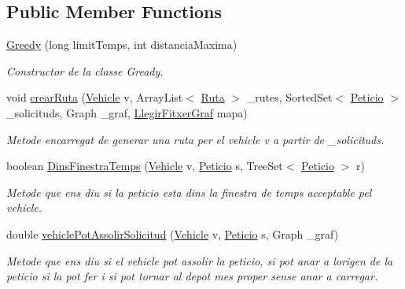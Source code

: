 \subsection*{Public Member Functions}
\begin{DoxyCompactItemize}
\item 
\hyperlink{class_portam_a_pro_p_1_1_greedy_abeac8894d01a8df14d99ced2988d66c3}{Greedy} (long limit\+Temps, int distancia\+Maxima)
\begin{DoxyCompactList}\small\item\em Constructor de la classe Gready. \end{DoxyCompactList}\item 
void \hyperlink{class_portam_a_pro_p_1_1_greedy_a88ab480dd626665d2480220b3a032cc9}{crear\+Ruta} (\hyperlink{class_portam_a_pro_p_1_1_vehicle}{Vehicle} v, Array\+List$<$ \hyperlink{class_portam_a_pro_p_1_1_ruta}{Ruta} $>$ \+\_\+rutes, Sorted\+Set$<$ \hyperlink{class_portam_a_pro_p_1_1_peticio}{Peticio} $>$ \+\_\+solicituds, Graph \+\_\+graf, \hyperlink{class_portam_a_pro_p_1_1_llegir_fitxer_graf}{Llegir\+Fitxer\+Graf} mapa)
\begin{DoxyCompactList}\small\item\em Metode encarregat de generar una ruta per el vehicle v a partir de \+\_\+solicituds. \end{DoxyCompactList}\item 
boolean \hyperlink{class_portam_a_pro_p_1_1_greedy_adf602e9d56f5dab642b1deb80719d7fa}{Dins\+Finestra\+Temps} (\hyperlink{class_portam_a_pro_p_1_1_vehicle}{Vehicle} v, \hyperlink{class_portam_a_pro_p_1_1_peticio}{Peticio} s, Tree\+Set$<$ \hyperlink{class_portam_a_pro_p_1_1_peticio}{Peticio} $>$ r)
\begin{DoxyCompactList}\small\item\em Metode que ens diu si la peticio esta dins la finestra de temps acceptable pel vehicle. \end{DoxyCompactList}\item 
double \hyperlink{class_portam_a_pro_p_1_1_greedy_ab5ac383d579ef9227ca99e52075e893d}{vehicle\+Pot\+Assolir\+Solicitud} (\hyperlink{class_portam_a_pro_p_1_1_vehicle}{Vehicle} v, \hyperlink{class_portam_a_pro_p_1_1_peticio}{Peticio} s, Graph \+\_\+graf)
\begin{DoxyCompactList}\small\item\em Metode que ens diu si el vehicle pot assolir la peticio, si pot anar a l\textquotesingle{}origen de la peticio si la pot fer i si pot tornar al depot mes proper sense anar a carregar. \end{DoxyCompactList}\item 

\end{DoxyCompactItemize}
